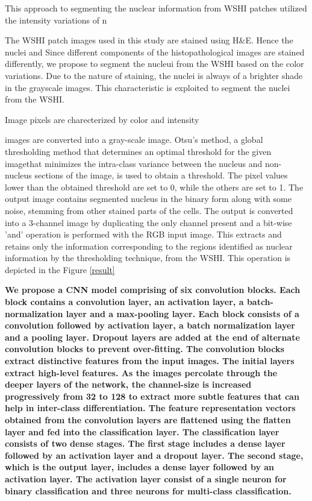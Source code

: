 \documentclass{comjnl}
\begin{document}
This approach to segmenting the nuclear information from WSHI patches utilized the intensity variations of n  

The WSHI patch images used in this study are stained using H&E. Hence the nuclei and Since different components of the histopathological images are stained differently, we propose  to  segment the nucleui from the WSHI based on the color variations. Due to the nature of staining, the nuclei is always of a brighter shade in the grayscale images. This characteristic is exploited to segment the nuclei from the WSHI. 
 
Image pixels are charecterized by color and intensity
 
 images are converted into a gray-scale image. Otsu's method, a global thresholding method that determines an optimal threshold for the given imagethat minimizes the intra-class variance between the nucleus and non-nucleus sections of the image, is used to obtain a threshold. The pixel values lower than the obtained threshold are set to 0, while the others are set to 1. The output image contains segmented nucleus in the binary form along with some noise, stemming from other stained parts of the cells.  The output is converted into a 3-channel image by duplicating the only channel present and a bit-wise 'and' operation is performed with the RGB input image. This extracts and retains only the information corresponding to the regions identified as nuclear information by the thresholding technique, from the WSHI. This operation is depicted in the Figure \ref{result} 

\textbf{
We propose a CNN model comprising of six convolution blocks. Each block contains a convolution layer, an activation layer, a batch-normalization layer and a max-pooling layer. Each block consists of a convolution followed by activation layer, a batch normalization layer and a pooling layer. Dropout layers are added at the end of alternate convolution blocks to prevent over-fitting. The convolution blocks extract distinctive features from the input images. The initial layers extract high-level features. As the images percolate through the deeper layers of the network, the channel-size is increased progressively from 32 to 128 to extract more subtle features that can help in inter-class differentiation. The feature representation vectors obtained from the convolution layers are flattened using the flatten layer and fed into the classification layer. The classification layer consists of two dense stages. The first stage includes a dense layer followed by an activation layer and a dropout layer. The second stage, which is the output layer, includes a dense layer followed by an activation layer. The activation layer consist of a single neuron for binary classification and three neurons for multi-class classification.
}
\end{document}
